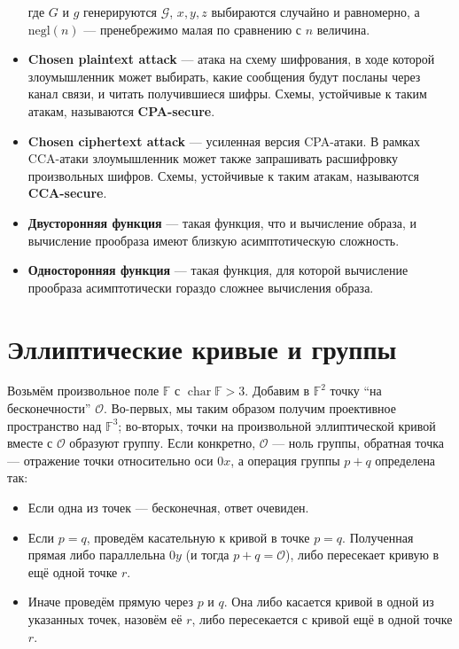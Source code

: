\documentclass[a4paper,14pt]{extarticle}
\DeclareMathOperator{\chr}{char}
\begin{document}
\begin{itemize}
        где $G$ и $g$ генерируются $\mathcal{G}$, $x, y, z$
        выбираются случайно и равномерно, а $\mathrm{negl}(n)$ --- пренебрежимо
        малая по сравнению с $n$ величина.
    \item \textbf{Chosen plaintext attack} --- атака на схему шифрования, в ходе
        которой злоумышленник может выбирать, какие сообщения будут посланы
        через канал связи, и читать получившиеся шифры. Схемы, устойчивые к
        таким атакам, называются \textbf{CPA-secure}.
    \item \textbf{Chosen ciphertext attack} --- усиленная версия CPA-атаки. В
        рамках CCA-атаки злоумышленник может также запрашивать расшифровку
        произвольных шифров. Схемы, устойчивые к таким атакам, называются
        \textbf{CCA-secure}.
    \item \textbf{Двусторонняя функция} --- такая функция, что и вычисление
        образа, и вычисление прообраза имеют близкую асимптотическую сложность.
    \item \textbf{Односторонняя функция} --- такая функция, для которой
        вычисление прообраза асимптотически гораздо сложнее вычисления образа.
\end{itemize}

\newpage

\section{Эллиптические кривые и группы}

Возьмём произвольное поле $\mathbb{F}$ с $\chr \mathbb{F} > 3$. Добавим в
$\mathbb{F}^2$ точку ``на бесконечности'' $\mathcal{O}$. Во-первых, мы таким
образом получим проективное пространство над $\mathbb{F}^3$; во-вторых, точки на
произвольной эллиптической кривой вместе с $\mathcal{O}$ образуют группу. Если
конкретно, $\mathcal{O}$ --- ноль группы, обратная точка --- отражение точки
относительно оси $0x$, а операция группы $p + q$ определена так:

\begin{itemize}
    \item Если одна из точек --- бесконечная, ответ очевиден.
    \item Если $p = q$, проведём касательную к кривой в точке $p = q$.
        Полученная прямая либо параллельна $0y$ (и тогда $p + q = \mathcal{O}$),
        либо пересекает кривую в ещё одной точке $r$.
    \item Иначе проведём прямую через $p$ и $q$. Она либо касается кривой в
        одной из указанных точек, назовём её $r$, либо пересекается с кривой ещё
        в одной точке $r$.
\end{itemize}
\end{document}
